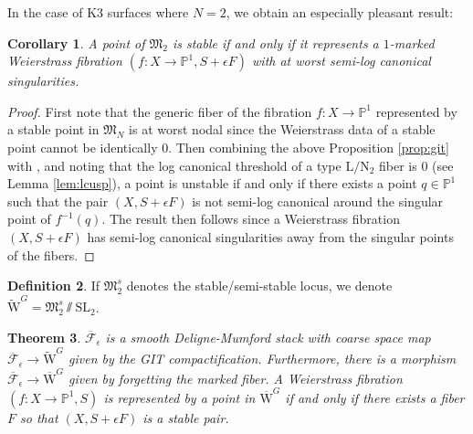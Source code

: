 \documentclass[11pt]{amsart}
\newtheorem{theorem}{Theorem}[section]
\newtheorem{cor}[theorem]{Corollary}
\theoremstyle{definition}
\newtheorem{definition}[theorem]{Definition}
\theoremstyle{remark}
\newcommand{\SL}{\mathrm{SL}}
\newcommand{\mb}[1]{\mathbb{#1}}
\newcommand{\oMG}{\overline{\mathrm{W}}^G}
\newcommand{\fe}{\overline{\mathcal{F}}_\epsilon}
\newcommand{\km}{\fe}
\newcommand{\oMGd}{\widetilde{\mathrm{W}}^G}
\begin{document}
	In the case of K3 surfaces where $N = 2$, we obtain an especially pleasant result: 
	
	\begin{cor}\label{cor:git} A point of $\mathfrak{M}_2$ is stable if and only if it represents a $1$-marked Weierstrass fibration $(f : X \to \mb{P}^1, S + \epsilon F)$ with at worst semi-log canonical singularities. \end{cor} 
	
	\begin{proof} First note that the generic fiber of the fibration $f : X \to \mb{P}^1$ represented by a stable point in $\mathfrak{M}_N$ is at worst nodal since the Weierstrass data of a stable point cannot be identically $0$.  Then combining the above Proposition \ref{prop:git} with \cite[Lemma 3.2.1, Lemma 3.2.2, Corollary 3.2.4]{ln}, and noting that the log canonical threshold of a type $\mathrm{L}/\mathrm{N}_2$ fiber is 0 (see Lemma \ref{lem:lcusp}),  a point is unstable if and only if there exists a point $q \in \mb{P}^1$ such that the pair $(X, S + \epsilon F)$ is not semi-log canonical around the singular point of $f^{-1}(q)$. The result then follows since a Weierstrass fibration $(X, S + \epsilon F)$ has semi-log canonical singularities away from the singular points of the fibers. \end{proof}
	
	\begin{definition}\label{def:git} If $\mathfrak{M}_2^s$ denotes the stable/semi-stable locus, we denote  $\oMGd = \mathfrak{M}_2^s \sslash \SL_2$.\end{definition}
	
	
	
	\begin{theorem}\label{thm:mainresult} $\km$ is a smooth Deligne-Mumford stack with coarse space map $\km \to \oMGd$ given by the GIT compactification. Furthermore, there is a morphism $\km \to \oMG$ given by forgetting the marked fiber. A Weierstrass fibration $(f : X \to \mb{P}^1, S)$ is represented by a point in $\oMG$ if and only if there exists a fiber $F$ so that $(X, S + \epsilon F)$ is a stable pair. \end{theorem} 
	
\end{document}
